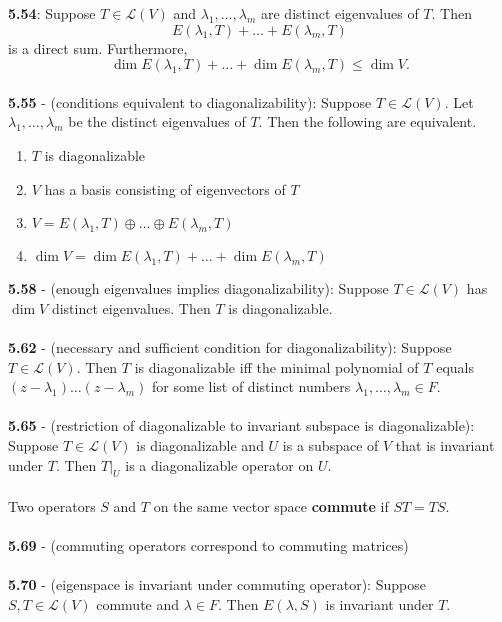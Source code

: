 \documentclass{article}
\DeclareMathOperator{\Dim}{dim}
\theoremstyle{definition}
\begin{document}
\textbf{5.54}: Suppose $T \in \mathcal{L}(V)$ and $\lambda_1, \dots, \lambda_m$ are distinct eigenvalues of $T$. Then $$E(\lambda_1, T) + \dots + E(\lambda_m, T)$$ is a direct sum. Furthermore, $$\Dim{E(\lambda_1, T)} + \dots + \Dim{E(\lambda_m, T)} \leq \Dim{V}.$$ \\
\textbf{5.55} - (conditions equivalent to diagonalizability): Suppose $T \in \mathcal{L}(V)$. Let $\lambda_1, \dots, \lambda_m$ be the distinct eigenvalues of $T$. Then the following are equivalent. \begin{enumerate}
    \item $T$ is diagonalizable
    \item $V$ has a basis consisting of eigenvectors of $T$
    \item $V = E(\lambda_1, T) \oplus \dots \oplus E(\lambda_m, T)$
    \item $\Dim{V} = \Dim{E(\lambda_1, T)} + \dots + \Dim{E(\lambda_m, T)}$
\end{enumerate} $ $ \\
\textbf{5.58} - (enough eigenvalues implies diagonalizability): Suppose $T \in \mathcal{L}(V)$ has $\Dim{V}$ distinct eigenvalues. Then $T$ is diagonalizable. \\ \\
\textbf{5.62} - (necessary and sufficient condition for diagonalizability): Suppose $T \in \mathcal{L}(V)$. Then $T$ is diagonalizable iff the minimal polynomial of $T$ equals $(z - \lambda_1) \dots (z - \lambda_m)$ for some list of distinct numbers $\lambda_1, \dots, \lambda_m \in F$. \\ \\
\textbf{5.65} - (restriction of diagonalizable to invariant subspace is diagonalizable): Suppose $T \in \mathcal{L}(V)$ is diagonalizable and $U$ is a subspace of $V$ that is invariant under $T$. Then $T|_U$ is a diagonalizable operator on $U$. \\ \\
Two operators $S$ and $T$ on the same vector space \textbf{commute} if $ST = TS$. \\ \\
\textbf{5.69} - (commuting operators correspond to commuting matrices) \\ \\
\textbf{5.70} - (eigenspace is invariant under commuting operator): Suppose $S, T \in \mathcal{L}(V)$ commute and $\lambda \in F$. Then $E(\lambda, S)$ is invariant under $T$. \\ \\
\end{document}
